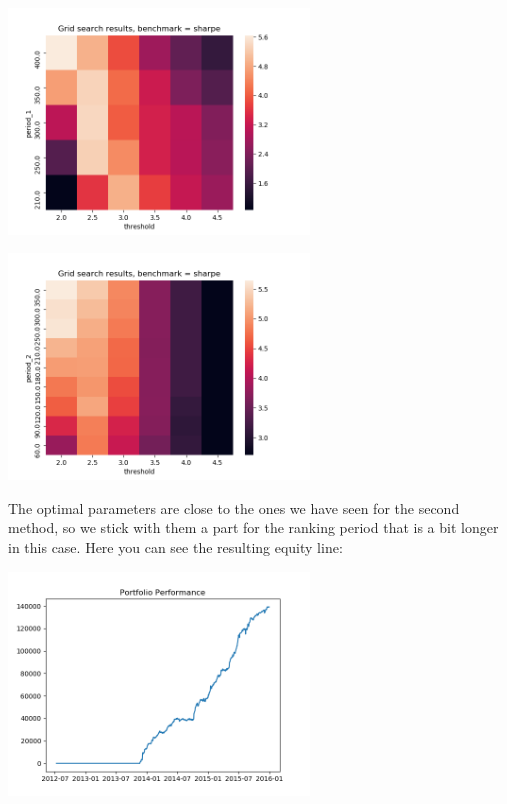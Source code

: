 \begin{center}
	\centering
	\includegraphics[width=0.6\textwidth]{GridSearches/Average_Drawdown/Figure_2.png}
	\label{Average_Drawdown_2}
\end{center}

\begin{center}
	\centering
	\includegraphics[width=0.6\textwidth]{GridSearches/Average_Drawdown/Figure_3.png}
	\label{Average_Drawdown_3}
\end{center}

The optimal parameters are close to the ones we have seen for the second method, so we stick with them a part for the ranking period that is a bit longer in this case. Here you can see the resulting equity line:

\begin{center}
	\centering
	\includegraphics[width=0.6\textwidth]{GridSearches/Average_Drawdown/Average_Drawdown_In_Sample_Performance.png}
	\label{Average_Drawdown_in_sample}
\end{center}


